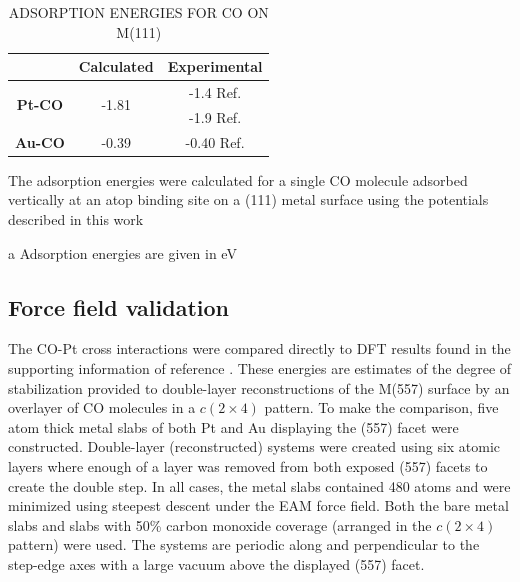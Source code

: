 \begin{table}[H]
\caption{ADSORPTION ENERGIES FOR CO ON M(111)}
\centering
\begin{threeparttable}
\begin{tabular}{ c  cc }
  \hline \hline
  & Calculated\tnote{a} & Experimental\tnote{a} \\
  \hline
  \multirow{2}{*}{\textbf{Pt-CO}} & \multirow{2}{*}{-1.81} & -1.4
  Ref. \citep{Kelemen:1979ad} \\
 & &  -1.9 Ref. \citep{Yeo:1997th} \\ \hline
  \textbf{Au-CO} & -0.39 & -0.40 Ref. \citep{Elliott:1984zt} \\
  \hline \hline
\end{tabular}
\begin{tablenotes}
  \item The adsorption energies were calculated for a single CO molecule
adsorbed vertically at an atop binding site on a (111) metal surface using the
potentials described in this work 
  \item[a] Adsorption energies are given in eV
\end{tablenotes}
\end{threeparttable}
\label{tab:co_energies}
\end{table}


\subsection{Force field validation}
The CO-Pt cross interactions were compared directly to DFT results
found in the supporting information of reference
\citep{Tao:2010aa}. These energies are
estimates of the degree of stabilization provided to double-layer
reconstructions of the M(557) surface by an overlayer of CO molecules
in a $c (2 \times 4)$ pattern.  To make the comparison, five atom
thick metal slabs of both Pt and Au displaying the (557) facet were
constructed.  Double-layer (reconstructed) systems were created using
six atomic layers where enough of a layer was removed from both
exposed (557) facets to create the double step.  In all cases, the
metal slabs contained 480 atoms and were minimized using steepest
descent under the EAM force field. Both the bare metal slabs and slabs
with 50\% carbon monoxide coverage (arranged in the $c (2 \times 4)$
pattern) were used.  The systems are periodic along and perpendicular
to the step-edge axes with a large vacuum above the displayed (557)
facet.


